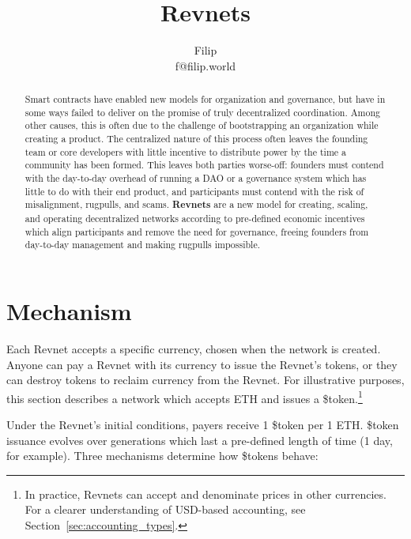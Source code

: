 \documentclass{article}
\title{Revnets}
\author{Filip\\f@filip.world}
\begin{document}
\maketitle

\begin{abstract}
  Smart contracts have enabled new models for organization and governance, but have in some ways failed to deliver on the promise of truly decentralized coordination. Among other causes, this is often due to the challenge of bootstrapping an organization while creating a product. The centralized nature of this process often leaves the founding team or core developers with little incentive to distribute power by the time a community has been formed. This leaves both parties worse-off: founders must contend with the day-to-day overhead of running a DAO or a governance system which has little to do with their end product, and participants must contend with the risk of misalignment, rugpulls, and scams. \textbf{Revnets} are a new model for creating, scaling, and operating decentralized networks according to pre-defined economic incentives which align participants and remove the need for governance, freeing founders from day-to-day management and making rugpulls impossible.
\end{abstract}

\section{Mechanism}

Each Revnet accepts a specific currency, chosen when the network is created. Anyone can pay a Revnet with its currency to issue the Revnet's tokens, or they can destroy tokens to reclaim currency from the Revnet. For illustrative purposes, this section describes a network which accepts ETH and issues a \$token.\footnote{In practice, Revnets can accept and denominate prices in other currencies. For a clearer understanding of USD-based accounting, see Section~\ref{sec:accounting_types}.}

Under the Revnet's initial conditions, payers receive 1 \$token per 1 ETH. \$token issuance evolves over generations which last a pre-defined length of time (1 day, for example). Three mechanisms determine how \$tokens behave:
\end{document}
